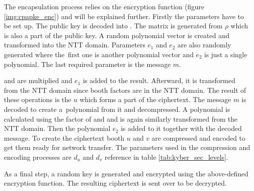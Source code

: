 The encapsulation process relies on the encryption function (figure \ref{img:cpapke_enc}) and will be explained further. Firstly the parameters have to be set up. The public key is decoded into . The matrix  is generated from $\rho$ which is also a part of the public key. A random polynomial vector  is created and transformed into the NTT domain. Parameters $e_1$ and $e_2$ are also randomly generated where the~first one is another polynomial vector and $e_2$ is just a single polynomial. The last required parameter is the message $m$.

 and  are multiplied and $e_1$ is added to the result. Afterward, it is transformed from the NTT domain since booth factors are in the NTT domain. The result of these operations is the $u$ which forms a part of the ciphertext. The message $m$ is decoded to create a~polynomial from it and decompressed. A polynomial is calculated using the factor of  and  and is again similarly transformed from the NTT domain. Then the polynomial $e_2$ is added to it together with the decoded message. To create the ciphertext booth $u$ and $v$ are compressed and encoded to get them ready for network transfer. The parameters used in the compression and encoding processes are $d_u$ and $d_v$ reference in table \ref{tab:kyber_sec_levels}.


As a final step, a random key is generated and encrypted using the above-defined encryption function. The resulting ciphertext is sent over to be decrypted.
